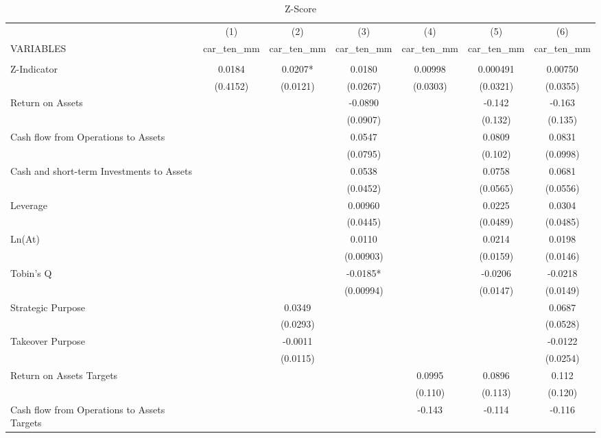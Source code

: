 \documentclass[12pt]{article}
\begin{document}
	\begin{table}[ht]
	\centering
	\caption{Z-Score}

	\begin{adjustbox}{height=10cm, max width=\textwidth}
		
		\begin{tabular}{lcccccc} \hline
			& (1) & (2) & (3) & (4) & (5) & (6) \\
		   VARIABLES & car\_ten\_mm & car\_ten\_mm & car\_ten\_mm & car\_ten\_mm & car\_ten\_mm & car\_ten\_mm \\ \hline
			&  &  &  &  &  &  \\
		   Z-Indicator & 0.0184 & 0.0207* & 0.0180 & 0.00998 & 0.000491 & 0.00750 \\
			& (0.4152) & (0.0121) & (0.0267) & (0.0303) & (0.0321) & (0.0355) \\
		   Return on Assets &  &  & -0.0890 &  & -0.142 & -0.163 \\
			&  &  & (0.0907) &  & (0.132) & (0.135) \\
		   Cash flow from Operations to Assets &  &  & 0.0547 &  & 0.0809 & 0.0831 \\
			&  &  & (0.0795) &  & (0.102) & (0.0998) \\
		   Cash and short-term Investments to Assets &  &  & 0.0538 &  & 0.0758 & 0.0681 \\
			&  &  & (0.0452) &  & (0.0565) & (0.0556) \\
		   Leverage &  &  & 0.00960 &  & 0.0225 & 0.0304 \\
			&  &  & (0.0445) &  & (0.0489) & (0.0485) \\
		   Ln(At) &  &  & 0.0110 &  & 0.0214 & 0.0198 \\
			&  &  & (0.00903) &  & (0.0159) & (0.0146) \\
		   Tobin's Q &  &  & -0.0185* &  & -0.0206 & -0.0218 \\
			&  &  & (0.00994) &  & (0.0147) & (0.0149) \\
		   Strategic Purpose &  & 0.0349 &  &  &  & 0.0687 \\
			&  & (0.0293) &  &  &  & (0.0528) \\
		   Takeover Purpose &  & -0.0011 &  &  &  & -0.0122 \\
			&  & (0.0115) &  &  &  & (0.0254) \\
		   Return on Assets Targets &  &  &  & 0.0995 & 0.0896 & 0.112 \\
			&  &  &  & (0.110) & (0.113) & (0.120) \\
		   Cash flow from Operations to Assets Targets &  &  &  & -0.143 & -0.114 & -0.116 \\

\end{tabular}
\end{adjustbox}
\end{table}
\end{document}
